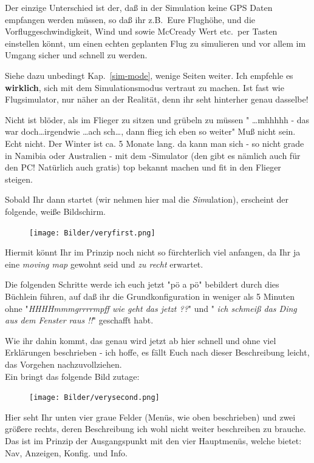 Der einzige Unterschied ist der, daß in der Simulation keine GPS Daten empfangen werden müssen, so daß ihr z.B.\ Eure Flughöhe, und die Vorfluggeschwindigkeit, Wind und sowie McCready Wert etc.\ per Tasten einstellen könnt, um einen echten geplanten Flug zu simulieren und vor allem im Umgang sicher und schnell zu werden.


Siehe dazu unbedingt Kap.~\ref{sim-mode}, wenige Seiten weiter. Ich empfehle es \textbf{wirklich}, sich mit dem Simulationsmodus vertraut zu machen. Ist fast wie Flugsimulator, nur näher an der Realität, denn ihr seht hinterher genau dasselbe!

Nicht ist blöder, als im Flieger zu sitzen und grübeln zu müssen " \dots  mhhhhh -  das war doch\dots  irgendwie \dots ach sch\dots , dann flieg ich eben so weiter" Muß nicht sein. Echt nicht.  Der Winter ist ca. 5 Monate lang. da kann man sich - so nicht grade in Namibia oder Australien - mit dem \xc -Simulator (den gibt es nämlich auch für den PC! Natürlich auch gratis) top bekannt machen und fit in den Flieger steigen.

Sobald Ihr \xc dann startet (wir nehmen hier mal die \textsl{Sim}ulation), erscheint der folgende, weiße Bildschirm.


\begin{figure}
\texttt{[image: Bilder/veryfirst.png]}
\end{figure}
Hiermit könnt Ihr im Prinzip noch nicht so fürchterlich viel anfangen, da Ihr ja eine \textsl{moving map} gewohnt seid und \textsl{zu recht} erwartet.

Die folgenden Schritte werde ich euch jetzt "pö a pö" bebildert durch dies Büchlein führen, auf daß ihr die Grundkonfiguration in weniger als 5 Minuten ohne "\textsl{HHHHmmmgrrrrmpff wie geht das jetzt ??}"  und " \textsl{ich schmeiß das Ding aus  dem Fenster raus !!}"  geschafft habt.

 Wie ihr dahin kommt, das genau wird jetzt ab hier schnell und ohne viel Erklärungen beschrieben  - ich hoffe, es fällt Euch nach dieser Beschreibung leicht, das Vorgehen nachzuvollziehen.\\

Ein \dklick bringt das folgende Bild zutage:
\begin{figure}
\texttt{[image: Bilder/verysecond.png]}
\end{figure}
Hier seht Ihr unten vier graue Felder (Menüs, wie  oben beschrieben) und zwei größere rechts, deren Beschreibung ich  wohl nicht weiter beschreiben zu brauche. Das ist im Prinzip der Ausgangspunkt mit den vier Hauptmenüs, welche \xc bietet: \textsf{Nav}, \textsf{Anzeigen},\textsf{ Konfig.} und \textsf{Info}.

